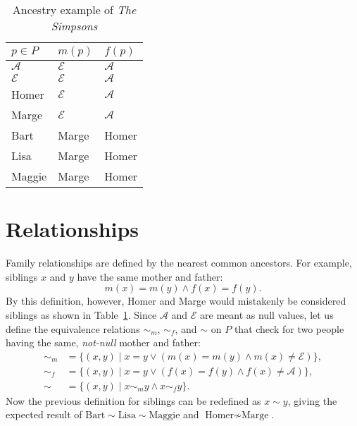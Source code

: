\documentclass[letterpaper]{article}
\begin{document}
\begin{table}
    \centering
    \begin{tabular}{lll}
        \toprule
        \(p \in P\)     & \(m(p)\)        & \(f(p)\)        \\
        \midrule
        \(\mathcal{A}\) & \(\mathcal{E}\) & \(\mathcal{A}\) \\
        \(\mathcal{E}\) & \(\mathcal{E}\) & \(\mathcal{A}\) \\
        Homer           & \(\mathcal{E}\) & \(\mathcal{A}\) \\
        Marge           & \(\mathcal{E}\) & \(\mathcal{A}\) \\
        Bart            & Marge           & Homer           \\
        Lisa            & Marge           & Homer           \\
        Maggie          & Marge           & Homer           \\
        \bottomrule
    \end{tabular}
    \caption{Ancestry example of \textit{The Simpsons}}\label{table:simpsons}
\end{table}

\section{Relationships}

Family relationships are defined by the nearest common ancestors.
For example, siblings \(x\) and \(y\) have the same mother and father:
\[
    m(x) = m(y) \land f(x) = f(y).
\]
By this definition, however, Homer and Marge would mistakenly be considered siblings as shown in Table~\ref{table:simpsons}.
Since \(\mathcal{A}\) and \(\mathcal{E}\) are meant as null values, let us define the equivalence relations \({\sim_m}\), \({\sim_f}\), and \({\sim}\) on \(P\) that check for two people having the same, \textit{not-null} mother and father:
\[
    \begin{aligned}
        {\sim_m} & = \{(x, y) \mid x = y \lor (m(x) = m(y) \land m(x) \neq \mathcal{E})\}, \\
        {\sim_f} & = \{(x, y) \mid x = y \lor (f(x) = f(y) \land f(x) \neq \mathcal{A})\}, \\
        {\sim}   & = \{(x, y) \mid x \sim_m y \land x \sim_f y\}.
    \end{aligned}
\]
Now the previous definition for siblings can be redefined as \(x \sim y\), giving the expected result of \(\text{Bart} \sim \text{Lisa} \sim \text{Maggie}\) and \(\text{Homer} \nsim \text{Marge}\).
\end{document}
